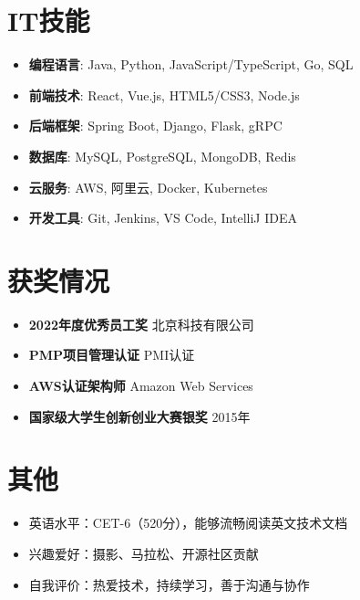 \documentclass[11pt,a4paper]{article}
\begin{document}
\section*{\faTools\quad IT技能}

\begin{itemize}
    \item \textbf{编程语言}: Java, Python, JavaScript/TypeScript, Go, SQL
    \item \textbf{前端技术}: React, Vue.js, HTML5/CSS3, Node.js
    \item \textbf{后端框架}: Spring Boot, Django, Flask, gRPC
    \item \textbf{数据库}: MySQL, PostgreSQL, MongoDB, Redis
    \item \textbf{云服务}: AWS, 阿里云, Docker, Kubernetes
    \item \textbf{开发工具}: Git, Jenkins, VS Code, IntelliJ IDEA
\end{itemize}

\section*{\faAward\quad 获奖情况}

\begin{itemize}
    \item \textbf{2022年度优秀员工奖} \hfill 北京科技有限公司
    \item \textbf{PMP项目管理认证} \hfill PMI认证
    \item \textbf{AWS认证架构师} \hfill Amazon Web Services
    \item \textbf{国家级大学生创新创业大赛银奖} \hfill 2015年
\end{itemize}

\section*{\faInfoCircle\quad 其他}

\begin{itemize}
    \item 英语水平：CET-6（520分），能够流畅阅读英文技术文档
    \item 兴趣爱好：摄影、马拉松、开源社区贡献
    \item 自我评价：热爱技术，持续学习，善于沟通与协作
\end{itemize}
\end{document}
